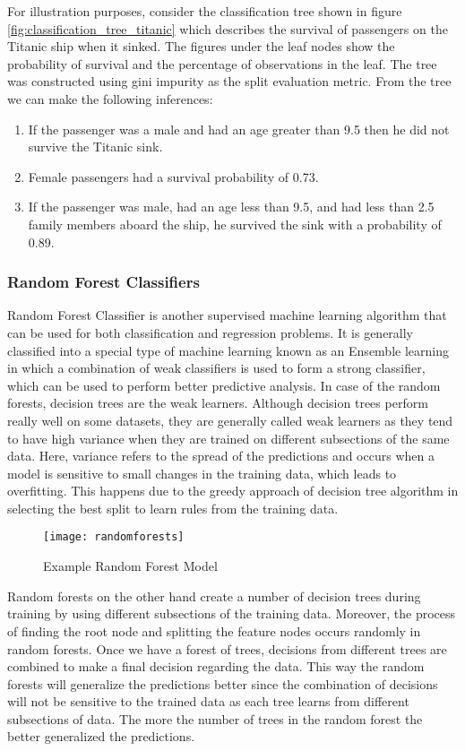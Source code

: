 \documentclass[11pt,openright]{report}
\begin{document}
For illustration purposes, consider the classification tree shown in figure \ref{fig:classification_tree_titanic}  which describes the survival of passengers on the Titanic ship when it sinked. The figures under the leaf nodes show the probability of survival and the percentage of observations in the leaf. The tree was constructed using gini impurity as the split evaluation metric. From the tree we can make the following inferences: 
\begin{enumerate}
  \item If the passenger was a male and had an age greater than 9.5 then he did not survive the Titanic sink.
  \item Female passengers had a survival probability of 0.73.
  \item If the passenger was male, had an age less than 9.5, and had less than 2.5 family members aboard the ship, he survived the sink with a probability of 0.89.
\end{enumerate}


\subsubsection {Random Forest Classifiers}  \label{sssec:rf}
Random Forest Classifier is another supervised machine learning algorithm that can be used for both classification and regression problems. It is generally classified into a special type of machine learning known as an Ensemble learning in which a combination of weak classifiers is used to form a strong classifier, which can be used to perform better predictive analysis. In case of the random forests, decision trees are the weak learners.  Although decision trees perform really well on some datasets, they are generally called weak learners as they tend to have high variance when they are trained on different subsections of the same data. Here, variance refers to the spread of the predictions and occurs when a model is sensitive to small changes in the training data, which leads to overfitting. This happens due to the greedy approach of decision tree algorithm in selecting the best split to learn rules from the training data.
  \begin{figure}
	\centering
	\texttt{[image: randomforests]}
	\caption{Example Random Forest Model}
	\label{fig:random_forest_trees}
\end{figure} 


Random forests on the other hand create a number of decision trees during training by using different subsections of the training data. Moreover, the process of finding the root node and splitting the feature nodes occurs randomly in random forests. Once we have a forest of trees, decisions from different trees are combined to make a final decision regarding the data. This way the random forests will generalize the predictions better since the combination of decisions will not be sensitive to the trained data as each tree learns from different subsections of data. The more the number of trees in the random forest the better generalized the predictions.
\end{document}
